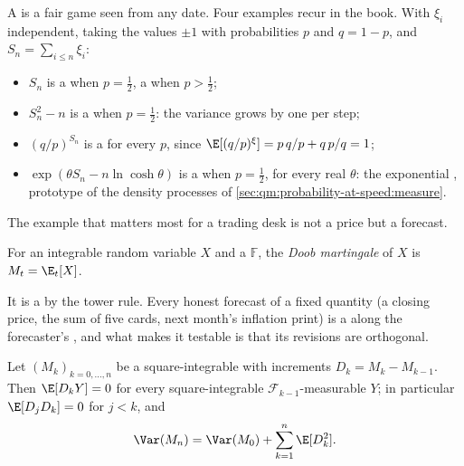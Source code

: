 A  is a fair game seen from any date. Four examples recur in the book. With $\xi_i$ independent, taking the values $\pm 1$ with
probabilities $p$ and $q = 1 - p$, and $S_n = \sum_{i \le n}\xi_i$:
\begin{itemize}
\item $S_n$ is a  when $p = \tfrac12$, a  when $p > \tfrac12$;
\item $S_n^2 - n$ is a  when $p = \tfrac12$: the variance grows by one per step;
\item $(q/p)^{S_n}$ is a  for every $p$, since $\E[(q/p)^{\xi}] = p\,q/p + q\,p/q = 1$;
\item $\exp(\theta S_n - n\ln\cosh\theta)$ is a  when $p = \tfrac12$, for every real
$\theta$: the exponential , prototype of the density processes of
\cref{sec:qm:probability-at-speed:measure}.
\end{itemize}

The example that matters most for a trading desk is not a price but a forecast.

\begin{definition}\label{def:qm:probability-at-speed:doob}
For an integrable random variable $X$ and a  $\mathbb F$, the \emph{Doob
martingale} of $X$ is $M_t = \E_t[X]$.
\end{definition}

It is a  by the tower rule. Every honest forecast of a fixed quantity (a closing
price, the sum of five cards, next month's inflation print) is a  along the
forecaster's , and what makes it testable is that its revisions are orthogonal.

\begin{proposition}\label{prop:qm:probability-at-speed:orthogonal}
Let $(M_k)_{k = 0,\dots,n}$ be a square-integrable  with increments $D_k = M_k -
M_{k-1}$. Then $\E[D_k Y] = 0$ for every square-integrable $\mathcal F_{k-1}$-measurable
$Y$; in particular $\E[D_jD_k] = 0$ for $j < k$, and
\[
\Var(M_n) = \Var(M_0) + \sum_{k=1}^n \E[D_k^2].
\]
\end{proposition}

